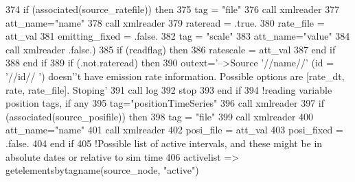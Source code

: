 \begin{DoxyCode}
374         \textcolor{keywordflow}{if} (\textcolor{keyword}{associated}(source\_ratefile)) \textcolor{keywordflow}{then}
375             tag = \textcolor{stringliteral}{"file"}
376             \textcolor{keyword}{call }xmlreader%
377             att\_name=\textcolor{stringliteral}{"name"}
378             \textcolor{keyword}{call }xmlreader%
379             rateread = .true.
380             rate\_file = att\_val
381             emitting\_fixed = .false.
382             tag = \textcolor{stringliteral}{"scale"}
383             att\_name=\textcolor{stringliteral}{"value"}
384             \textcolor{keyword}{call }xmlreader%
      .false.)            
385             \textcolor{keywordflow}{if} (readflag) \textcolor{keywordflow}{then}
386                 ratescale = att\_val%
387 \textcolor{keywordflow}{            end if}
388 \textcolor{keywordflow}{        end if}
389         \textcolor{keywordflow}{if} (.not.rateread) \textcolor{keywordflow}{then}
390             outext=\textcolor{stringliteral}{'-->Source '}//name//\textcolor{stringliteral}{' (id = '}//id// \textcolor{stringliteral}{') doesn'}\textcolor{stringliteral}{'t have emission rate information. Possible
       options are [rate\_dt, rate, rate\_file]. Stoping'}
391             \textcolor{keyword}{call }log%
392             stop
393 \textcolor{keywordflow}{        end if}
394         \textcolor{comment}{!reading variable position tags, if any}
395         tag=\textcolor{stringliteral}{"positionTimeSeries"}
396         \textcolor{keyword}{call }xmlreader%
397         \textcolor{keywordflow}{if} (\textcolor{keyword}{associated}(source\_posifile)) \textcolor{keywordflow}{then}
398             tag = \textcolor{stringliteral}{"file"}
399             \textcolor{keyword}{call }xmlreader%
400             att\_name=\textcolor{stringliteral}{"name"}
401             \textcolor{keyword}{call }xmlreader%
402             posi\_file = att\_val
403             posi\_fixed = .false.
404 \textcolor{keywordflow}{        end if}
405         \textcolor{comment}{!Possible list of active intervals, and these might be in absolute dates or relative to sim time}
406         activelist => getelementsbytagname(source\_node, \textcolor{stringliteral}{"active"})

\end{DoxyCode}
